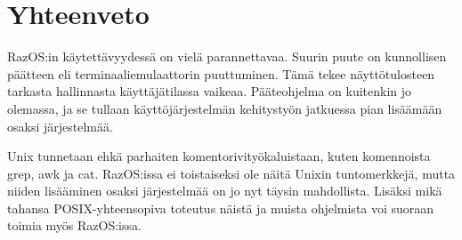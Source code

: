 \chapter{Yhteenveto}

RazOS:in käytettävyydessä on vielä parannettavaa. Suurin puute on kunnollisen päätteen eli terminaaliemulaattorin puuttuminen. Tämä tekee näyttötulosteen tarkasta hallinnasta käyttäjätilassa vaikeaa. Pääteohjelma on kuitenkin jo olemassa, ja se tullaan käyttöjärjestelmän kehitystyön jatkuessa pian lisäämään osaksi järjestelmää.

\par

Unix tunnetaan ehkä parhaiten komentorivityökaluistaan, kuten komennoista grep, awk ja cat. RazOS:issa ei toistaiseksi ole näitä Unixin tuntomerkkejä, mutta niiden lisääminen osaksi järjestelmää on jo nyt täysin mahdollista. Lisäksi mikä tahansa POSIX-yhteensopiva toteutus näistä ja muista ohjelmista voi suoraan toimia myös RazOS:issa.
